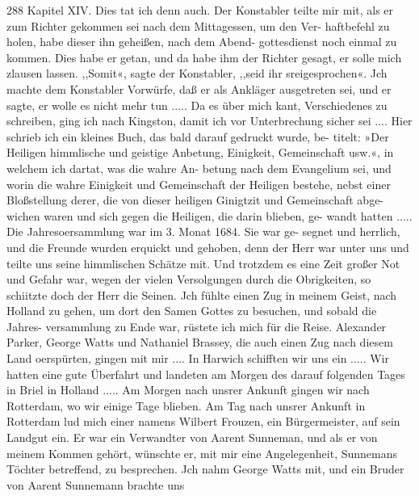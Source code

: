 288 Kapitel XIV.
Dies tat ich denn auch. Der Konstabler teilte mir mit, als er
zum Richter gekommen sei nach dem Mittagessen, um den Ver-
haftbefehl zu holen, habe dieser ihn geheißen, nach dem Abend-
gottesdienst noch einmal zu kommen. Dies habe er getan, und da
habe ihm der Richter gesagt, er solle mich zlausen lassen. ,,Somit«,
sagte der Konstabler, ,,seid ihr sreigesprochen«. Jch machte dem
Konstabler Vorwürfe, daß er als Ankläger ausgetreten sei, und
er sagte, er wolle es nicht mehr tun .....
Da es über mich kant, Verschiedenes zu schreiben, ging ich
nach Kingston, damit ich vor Unterbrechung sicher sei .... Hier
schrieb ich ein kleines Buch, das bald darauf gedruckt wurde, be-
titelt: »Der Heiligen himmlische und geistige Anbetung, Einigkeit,
Gemeinschaft usw.«, in welchem ich dartat, was die wahre An-
betung nach dem Evangelium sei, und worin die wahre Einigkeit
und Gemeinschaft der Heiligen bestehe, nebst einer Bloßstellung
derer, die von dieser heiligen Ginigtzit und Gemeinschaft abge-
wichen waren und sich gegen die Heiligen, die darin blieben, ge-
wandt hatten .....
Die Jahresoersammlung war im 3. Monat 1684. Sie war ge-
segnet und herrlich, und die Freunde wurden erquickt und gehoben,
denn der Herr war unter uns und teilte uns seine himmlischen
Schätze mit. Und trotzdem es eine Zeit großer Not und Gefahr
war, wegen der vielen Versolgungen durch die Obrigkeiten, so
schiitzte doch der Herr die Seinen.
Jch fühlte einen Zug in meinem Geist, nach Holland zu gehen,
um dort den Samen Gottes zu besuchen, und sobald die Jahres-
versammlung zu Ende war, rüstete ich mich für die Reise.
Alexander Parker, George Watts und Nathaniel Brassey, die
auch einen Zug nach diesem Land oerspürten, gingen mit mir ....
In Harwich schifften wir uns ein ..... Wir hatten eine gute
Überfahrt und landeten am Morgen des darauf folgenden Tages
in Briel in Holland ..... Am Morgen nach unsrer Ankunft
gingen wir nach Rotterdam, wo wir einige Tage blieben. Am
Tag nach unsrer Ankunft in Rotterdam lud mich einer namens
Wilbert Frouzen, ein Bürgermeister, auf sein Landgut ein. Er
war ein Verwandter von Aarent Sunneman, und als er von
meinem Kommen gehört, wünschte er, mit mir eine Angelegenheit,
Sunnemans Töchter betreffend, zu besprechen. Jch nahm George
Watts mit, und ein Bruder von Aarent Sunnemann brachte uns


